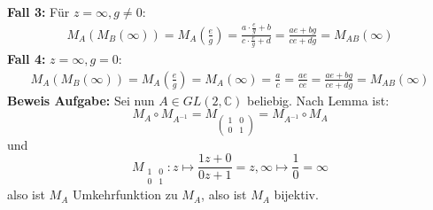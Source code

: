 \begin{problem*}[3]
\begin{align*}
\end{align*}
\textbf{Fall 3: } Für $ z = \infty, g \neq 0$: 
\begin{align*}
M_A(M_B(\infty)) = M_A\left(\frac{e}{g}\right) = \frac{a \cdot \frac{e}{g} + b}{c \cdot \frac{e}{g} + d}
 = \frac{ae + bg}{ce+dg} = M_{ AB }(\infty)  
\end{align*}
\textbf{Fall 4: } $ z = \infty, g = 0:$
\begin{align*}
M_A(M_B(\infty)) = M_A\left(\frac{e}{g}\right) = M_A(\infty) = \frac{a}{c} = \frac{ae}{ce} = \frac{ae + bg}{ce + dg} = M_{ AB }(\infty) 
\end{align*}
\textbf{Beweis Aufgabe:} Sei nun $A \in GL(2,\mathbb{C})$ beliebig. Nach Lemma ist:
\begin{equation*}
  M_A \circ M_{ A^{ -1 } } = M_{ \left(\begin{smallmatrix}
  1 & 0 \\
  0 & 1 
  \end{smallmatrix}\right) } = M_{ A^{-1 } } \circ M_A
\end{equation*}
und 
\begin{equation*}
  M_{ \begin{smallmatrix}
  1 & 0 \\
  0 & 1 
  \end{smallmatrix} } : z \mapsto \frac{1z+0}{0z+1} = z, \infty \mapsto \frac{1}{0} = \infty 
\end{equation*}
also ist $M_A$ Umkehrfunktion zu $M_A$, also ist $M_A$ bijektiv.\\
\end{problem*}

